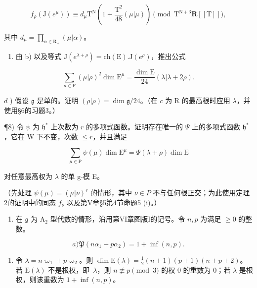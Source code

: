 \[
  f _ {\rho} (\mathrm{J} (e ^ {\mu})) \equiv d _ {\mu} \mathrm{T} ^ {\mathrm{N}} \left(1 + \frac {\mathrm{T} ^ {2}}{48} (\mu | \mu)\right) \pmod {\mathrm{T} ^ {\mathrm{N} + 3} \mathbf {R} [ [ \mathrm{T} ] ]},
\]

其中 \(d_{\mu} = \prod_{\alpha \in \mathrm{R}_{+}}(\mu |\alpha)\)。

\begin{enumerate}
\def\labelenumi{\alph{enumi})}
\setcounter{enumi}{2}
\tightlist
\item
  由 b) 以及等式 \(\mathrm{J}(e^{\lambda+\rho})=\mathrm{ch}(\mathrm{E}).\mathrm{J}(e^{\rho})\)，推出公式
\end{enumerate}

\[
  \sum_ {\mu \in \mathrm{P}} (\mu | \rho) ^ {2} \dim \mathrm{E} ^ {\mu} = \frac {\dim \mathrm{E}}{24} (\lambda | \lambda + 2 \rho).
\]

\(d\) ) 假设 \(\mathfrak{g}\) 是单的。证明 \((\rho |\rho) = \dim \mathfrak{g} / 24\)。（在 \(c\) 为 R 的最高根时应用 \(\lambda\)，并使用§6的习题3。）

¶8) 令 \(\psi\) 为 \(\mathfrak{h}^*\) 上次数为 \(r\) 的多项式函数。证明存在唯一的 \(\varPsi\) 上的多项式函数 \(\mathfrak{h}^*\)，它在 W 下不变，次数 \(\leq r\)，并且满足

\[
\sum_ {\mu \in \mathrm{P}} \psi (\mu) \dim \mathrm{E} ^ {\mu} = \varPsi (\lambda + \rho) \dim \mathrm{E}
\]

对任意最高权为 \(\lambda\) 的单 g-模 E。

（先处理 \(\psi(\mu)=(\mu|\nu)^{r}\) 的情形，其中 \(\nu\in P\) 不与任何根正交；为此使用定理2的证明中的同态 \(f_{\nu}\) 以及第V章§5第4节命题5 (i)。）

\begin{enumerate}
\def\labelenumi{\arabic{enumi})}
\setcounter{enumi}{8}
\tightlist
\item
  在 \(\mathfrak{g}\) 为 \(\mathrm{A}_2\) 型代数的情形，沿用第VI章图版I的记号。令 \(n, p\) 为满足 \(\geq 0\) 的整数。
\end{enumerate}

\[
a) \mathfrak {P} (n \alpha_ {1} + p \alpha_ {2}) = 1 + \inf (n, p).
\]

\begin{enumerate}
\def\labelenumi{\alph{enumi})}
\setcounter{enumi}{1}
\tightlist
\item
  令 \(\lambda = n\varpi_1 + p\varpi_2\)。则 \(\dim \mathrm{E}(\lambda) = \frac{1}{2}(n + 1)(p + 1)(n + p + 2)\)。若 \(\mathrm{E}(\lambda)\) 不是根权，即~\(\lambda\)，则 \(n \not\equiv p \pmod{3}\) 的权 0 的重数为 0；若 \(\lambda\) 是根权，则该重数为 \(1 + \inf(n,p)\)。
\end{enumerate}


